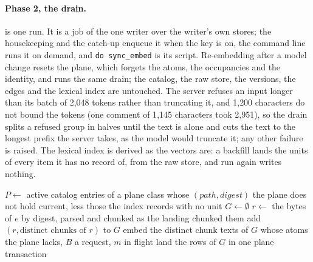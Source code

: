 \documentclass[11pt]{article}
\theoremstyle{plain}
\theoremstyle{definition}
\theoremstyle{remark}
\newcommand{\code}[1]{\texttt{#1}}
\begin{document}
\paragraph{Phase 2, the drain.}  is one run. It is a job of the one writer over
the writer's own stores; the housekeeping and the catch-up enqueue it when the key is on, the
command line runs it on demand, and \code{do sync\_embed} is its script. Re-embedding after a
model change resets the plane, which forgets the atoms, the occupancies and the identity, and runs
the same drain; the catalog, the raw store, the versions, the edges and the lexical index are
untouched. The server refuses an input longer than its batch of 2{,}048 tokens rather than
truncating it, and 1{,}200 characters do not bound the tokens (one comment of 1{,}145 characters
took 2{,}951), so the drain splits a refused group in halves until the text is alone and cuts the
text to the longest prefix the server takes, as the model would truncate it; any other failure is
raised. The lexical index is derived as the vectors are: a backfill lands the units of every item it
has no record of, from the raw store, and run again writes nothing.

\begin{algorithm}[t]
\caption{The embed drain (\code{core/ingest/derive.py}), batch $B$, streams $m$.}
\label{alg:drain}
\begin{algorithmic}[1]
\State $P \gets$ active catalog entries of a plane class whose $(\mathit{path}, \mathit{digest})$ the plane does not hold current, less those the index records with no unit 
\State $G \gets \emptyset$
  \State $r \gets$ the bytes of $e$ by digest, parsed and chunked as the landing chunked them
   add $(r, \text{distinct chunks of } r)$ to $G$ \EndIf
    \EndIf
\EndFor
\State {}
  \State embed the distinct chunk texts of $G$ whose atoms the plane lacks, $B$ a request, $m$ in flight
  \State land the rows of $G$ in one plane transaction 
\EndProcedure
\end{algorithmic}
\end{algorithm}
\end{document}

